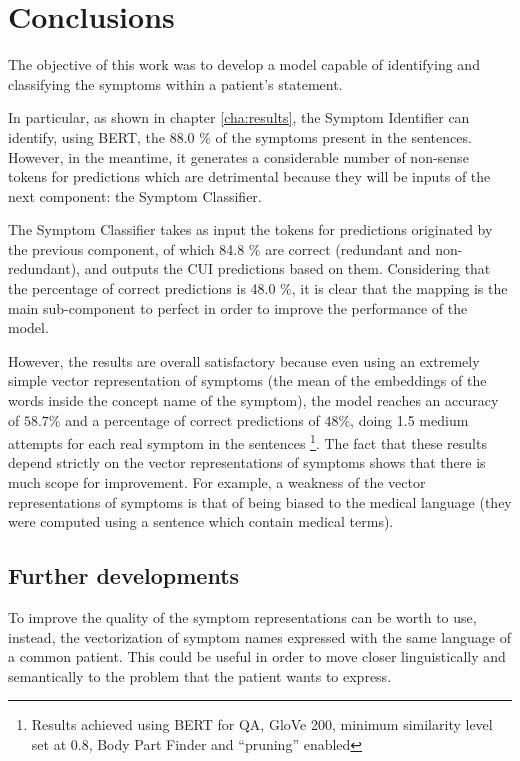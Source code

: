 \chapter{Conclusions}
\label{cha:conclusions}

The objective of this work was to develop a model capable of identifying and classifying the symptoms within a patient's statement.

In particular, as shown in chapter \ref{cha:results}, the Symptom Identifier can identify, using BERT, the 88.0 \% of the symptoms present in the sentences. However, in the meantime, it generates a considerable number of non-sense tokens for predictions which are detrimental because they will be inputs of the next component: the Symptom Classifier.

The Symptom Classifier takes as input the tokens for predictions originated by the previous component, of which 84.8 \% are correct (redundant and non-redundant), and outputs the CUI predictions based on them. Considering that the percentage of correct predictions is 48.0 \%, it is clear that the mapping is the main sub-component to perfect in order to improve the performance of the model.

However, the results are overall satisfactory because even using an extremely simple vector representation of symptoms (the mean of the embeddings of the words inside the concept name of the symptom), the model reaches an accuracy of $58.7 \%$ and a percentage of correct predictions of $48 \%$, doing 1.5 medium attempts for each real symptom in the sentences \footnote{Results achieved using BERT for QA, GloVe 200, minimum similarity level set at 0.8, Body Part Finder and ``pruning'' enabled}. The fact that these results depend strictly on the vector representations of symptoms shows that there is much scope for improvement. For example, a weakness of the vector representations of symptoms is that of being biased to the medical language (they were computed using a sentence which contain medical terms). 

\section{Further developments}
To improve the quality of the symptom representations can be worth to use, instead, the vectorization of symptom names expressed with the same language of a common patient. This could be useful in order to move closer linguistically and semantically to the problem that the patient wants to express.

